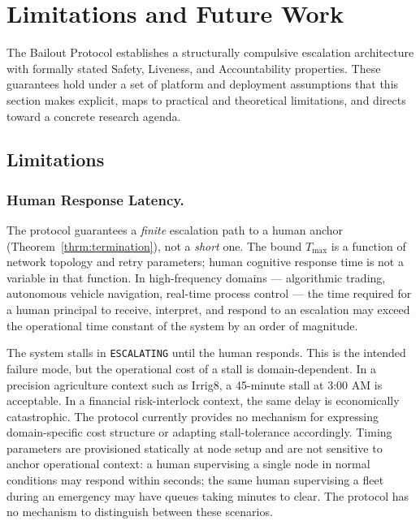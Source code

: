 \section{Limitations and Future Work}\label{sec:limitations}

The Bailout Protocol establishes a structurally compulsive escalation architecture with formally stated Safety, Liveness, and Accountability properties. These guarantees hold under a set of platform and deployment assumptions that this section makes explicit, maps to practical and theoretical limitations, and directs toward a concrete research agenda.

\subsection{Limitations}

\subsubsection{Human Response Latency.}
\label{sec:limitations-latency}

The protocol guarantees a \emph{finite} escalation path to a human anchor (Theorem~\ref{thrm:termination}), not a \emph{short} one. The bound $T_{\max}$ is a function of network topology and retry parameters; human cognitive response time is not a variable in that function. In high-frequency domains — algorithmic trading, autonomous vehicle navigation, real-time process control — the time required for a human principal to receive, interpret, and respond to an escalation may exceed the operational time constant of the system by an order of magnitude.

The system stalls in \texttt{ESCALATING} until the human responds. This is the intended failure mode, but the operational cost of a stall is domain-dependent. In a precision agriculture context such as Irrig8, a 45-minute stall at 3:00 AM is acceptable. In a financial risk-interlock context, the same delay is economically catastrophic. The protocol currently provides no mechanism for expressing domain-specific cost structure or adapting stall-tolerance accordingly. Timing parameters are provisioned statically at node setup and are not sensitive to anchor operational context: a human supervising a single node in normal conditions may respond within seconds; the same human supervising a fleet during an emergency may have queues taking minutes to clear. The protocol has no mechanism to distinguish between these scenarios.

